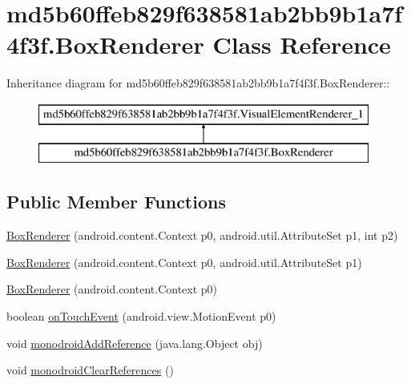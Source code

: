 \hypertarget{classmd5b60ffeb829f638581ab2bb9b1a7f4f3f_1_1_box_renderer}{
\section{md5b60ffeb829f638581ab2bb9b1a7f4f3f.BoxRenderer Class Reference}
\label{classmd5b60ffeb829f638581ab2bb9b1a7f4f3f_1_1_box_renderer}
}
Inheritance diagram for md5b60ffeb829f638581ab2bb9b1a7f4f3f.BoxRenderer::\begin{figure}[H]
\begin{center}
\leavevmode
\includegraphics[height=2cm]{classmd5b60ffeb829f638581ab2bb9b1a7f4f3f_1_1_box_renderer}
\end{center}
\end{figure}
\subsection*{Public Member Functions}
\begin{CompactItemize}
\item 
\hyperlink{classmd5b60ffeb829f638581ab2bb9b1a7f4f3f_1_1_box_renderer_ed7df0c4a87dc8a3d6e9de801d7dc37a}{BoxRenderer} (android.content.Context p0, android.util.AttributeSet p1, int p2)
\item 
\hyperlink{classmd5b60ffeb829f638581ab2bb9b1a7f4f3f_1_1_box_renderer_6500633c0eb2247796670cf8d19b41c0}{BoxRenderer} (android.content.Context p0, android.util.AttributeSet p1)
\item 
\hyperlink{classmd5b60ffeb829f638581ab2bb9b1a7f4f3f_1_1_box_renderer_2b1771eeb58746c23b513587c18ea9de}{BoxRenderer} (android.content.Context p0)
\item 
boolean \hyperlink{classmd5b60ffeb829f638581ab2bb9b1a7f4f3f_1_1_box_renderer_7dbb553b416a3c1e05c3c31699665a75}{onTouchEvent} (android.view.MotionEvent p0)
\item 
void \hyperlink{classmd5b60ffeb829f638581ab2bb9b1a7f4f3f_1_1_box_renderer_2c691e6eae3cfe1b2cfe9fbee3e51baf}{monodroidAddReference} (java.lang.Object obj)
\item 
void \hyperlink{classmd5b60ffeb829f638581ab2bb9b1a7f4f3f_1_1_box_renderer_2f64a02b513057089e1099ba75855aa2}{monodroidClearReferences} ()
\end{CompactItemize}
